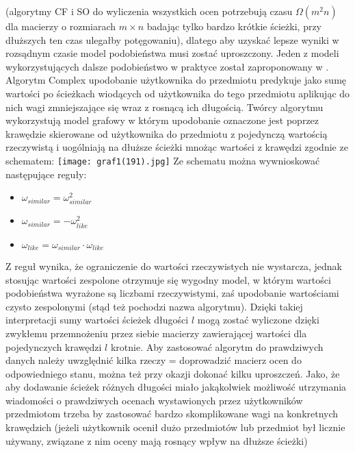 \documentclass{pracamgr}
\begin{document}
    (algorytmy CF i SO do wyliczenia wszystkich ocen potrzebują czasu $\Omega(m^2n)$ dla macierzy o rozmiarach $m\times n$ badając tylko bardzo krótkie ścieżki,
    przy dłuższych ten czas ulegałby potęgowaniu), dlatego aby uzyskać lepsze wyniki w rozsądnym czasie model podobieństwa musi zostać uproszczony.
    Jeden z modeli wykorzystujących dalsze podobieństwo w praktyce został zaproponowany w \cite{205}. Algorytm Complex upodobanie użytkownika do przedmiotu
    predykuje jako sumę wartości po ścieżkach wiodących od użytkownika do tego przedmiotu aplikując do nich wagi zmniejszające się wraz z rosnącą ich długością.
    Twórcy algorytmu wykorzystują model grafowy w którym upodobanie oznaczone jest poprzez krawędzie skierowane
    od użytkownika do przedmiotu z pojedynczą wartością rzeczywistą i uogólniają na dłuższe ścieżki mnożąc wartości z krawędzi zgodnie ze schematem:\newline
     \texttt{[image: graf1(191).jpg]}\newline
    Ze schematu można wywnioskować następujące reguły:
    \begin{itemize}\itemsep1pt \parskip0pt 
     \item $\omega_{similar}=\omega^2_{similar}$    
     \item $\omega_{similar}=-\omega^2_{like}$
     \item $\omega_{like}=\omega_{similar}\cdot\omega_{like}$
    \end{itemize}
    Z reguł wynika, że ograniczenie do wartości rzeczywistych nie wystarcza, jednak stosując wartości zespolone otrzymuje się wygodny model,
    w którym wartości podobieństwa wyrażone są liczbami rzeczywistymi, zaś upodobanie wartościami czysto zespolonymi (stąd też pochodzi nazwa algorytmu).
    Dzięki takiej interpretacji sumy wartości ścieżek długości $l$ mogą zostać wyliczone dzięki zwykłemu przemnożeniu przez siebie macierzy zawierającej
    wartości dla pojedynczych krawędzi $l$ krotnie.\newline
    Aby zastosować algorytm do prawdziwych danych należy uwzględnić kilka rzeczy = doprowadzić macierz ocen do odpowiedniego stanu,
    można też przy okazji dokonać kilku uproszczeń.
    Jako, że aby dodawanie ścieżek różnych długości miało jakąkolwiek możliwość utrzymania wiadomości
    o prawdziwych ocenach wystawionych przez użytkowników przedmiotom trzeba by zastosować bardzo skomplikowane wagi na konkretnych krawędzich
    (jeżeli użytkownik ocenił dużo przedmiotów lub przedmiot był licznie używany, związane z nim oceny mają rosnący wpływ na dłuższe ścieżki)
\end{document}
